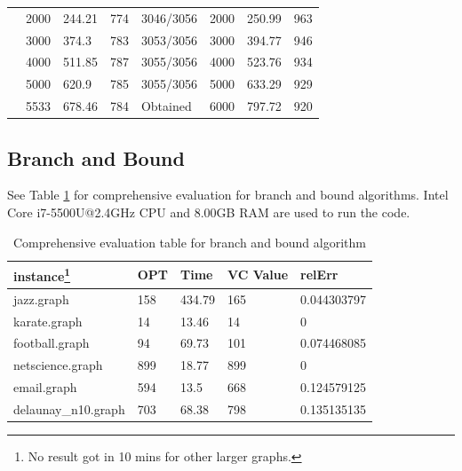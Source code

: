 \begin{table}[htb]
\begin{minipage}{\columnwidth}
\begin{center}
\begin{tabular}{@{}llllllll@{}}
              & 2000      & 244.21 & 774 & 3046/3056                                          & 2000        & 250.99   & 963  \\
              & 3000      & 374.3  & 783 & 3053/3056                                          & 3000        & 394.77   & 946  \\
              & 4000      & 511.85 & 787 & 3055/3056                                          & 4000        & 523.76   & 934  \\
              & 5000      & 620.9  & 785 & 3055/3056                                          & 5000        & 633.29   & 929  \\
              & 5533      & 678.46 & 784 & Obtained                                           & 6000        & 797.72   & 920  \\ \bottomrule
\end{tabular}
\end{center}
\end{minipage}
\end{table}

\subsection{Branch and Bound}
See Table \ref{tab3} for comprehensive evaluation for branch and bound algorithms. Intel Core i7-5500U@2.4GHz CPU and 8.00GB RAM are used to run the code.
\begin{table}[htb]
\caption{Comprehensive evaluation table for branch and bound algorithm}
\label{tab3}
\begin{minipage}{\columnwidth}
\begin{center}
\begin{tabular}{@{}lllll@{}}
\toprule
instance\footnote{No result got in 10 mins for other larger graphs.} & OPT & Time   & VC Value & relErr      \\ \midrule
jazz.graph          & 158 & 434.79 & 165      & 0.044303797 \\
karate.graph        & 14  & 13.46  & 14       & 0           \\
football.graph      & 94  & 69.73  & 101      & 0.074468085 \\
netscience.graph    & 899 & 18.77  & 899      & 0           \\
email.graph         & 594 & 13.5   & 668      & 0.124579125 \\
delaunay\_n10.graph & 703 & 68.38  & 798      & 0.135135135 \\ \bottomrule
\end{tabular}
\end{center}
\end{minipage}
\end{table}

